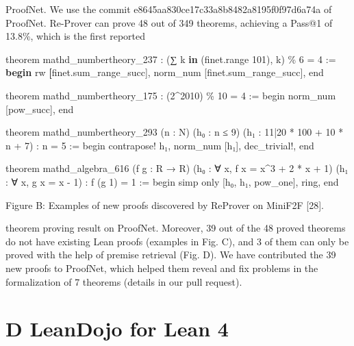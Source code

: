 \documentclass[
]{article}
\newenvironment{Shaded}{}{}
\newcommand{\AttributeTok}[1]{\textcolor[rgb]{0.49,0.56,0.16}{#1}}
\newcommand{\ControlFlowTok}[1]{\textcolor[rgb]{0.00,0.44,0.13}{\textbf{#1}}}
\newcommand{\DecValTok}[1]{\textcolor[rgb]{0.25,0.63,0.44}{#1}}
\newcommand{\KeywordTok}[1]{\textcolor[rgb]{0.00,0.44,0.13}{\textbf{#1}}}
\newcommand{\NormalTok}[1]{#1}
\newcommand{\OperatorTok}[1]{\textcolor[rgb]{0.40,0.40,0.40}{#1}}
\newcommand{\VerbatimStringTok}[1]{\textcolor[rgb]{0.25,0.44,0.63}{#1}}
\begin{document}
ProofNet. We use the commit e8645aa830ce17c33a8b8482a8195f0f97d6a74a of
ProofNet. Re-Prover can prove 48 out of 349 theorems, achieving a Pass@1
of 13.8\%, which is the first reported

\begin{Shaded}
\begin{Highlighting}[]
\NormalTok{theorem mathd\_numbertheory\_237 }\OperatorTok{:}
\NormalTok{(∑ k }\ControlFlowTok{in}\NormalTok{ (finet}\AttributeTok{.range} \DecValTok{101}\NormalTok{), k) }\OperatorTok{\%} \DecValTok{6} \OperatorTok{=} \DecValTok{4} \OperatorTok{:=}
\ControlFlowTok{begin}
\NormalTok{rw }\KeywordTok{[}\NormalTok{finet}\AttributeTok{.sum\_range\_succ}\VerbatimStringTok{\textquotesingle{}],}
\VerbatimStringTok{norm\_num [finet.sum\_range\_succ],}
\VerbatimStringTok{end}

\VerbatimStringTok{theorem mathd\_numbertheory\_175 :}
\VerbatimStringTok{(2\^{}2010) \% 10 = 4 :=}
\VerbatimStringTok{begin}
\VerbatimStringTok{norm\_num [pow\_succ],}
\VerbatimStringTok{end}

\VerbatimStringTok{theorem mathd\_numbertheory\_293}
\VerbatimStringTok{(n : N)}
\VerbatimStringTok{(h₀ : n ≤ 9)}
\VerbatimStringTok{(h₁ : 11|20 * 100 + 10 * n + 7) :}
\VerbatimStringTok{n = 5 :=}
\VerbatimStringTok{begin}
\VerbatimStringTok{contrapose! h₁,}
\VerbatimStringTok{norm\_num [h₁],}
\VerbatimStringTok{dec\_trivial!,}
\VerbatimStringTok{end}

\VerbatimStringTok{theorem mathd\_algebra\_616}
\VerbatimStringTok{(f g : R → R)}
\VerbatimStringTok{(h₀ : ∀ x, f x = x\^{}3 + 2 * x + 1)}
\VerbatimStringTok{(h₁ : ∀ x, g x = x {-} 1) :}
\VerbatimStringTok{f (g 1) = 1 :=}
\VerbatimStringTok{begin}
\VerbatimStringTok{simp only [h₀, h₁, pow\_one],}
\VerbatimStringTok{ring,}
\VerbatimStringTok{end }
\end{Highlighting}
\end{Shaded}

Figure B: Examples of new proofs discovered by ReProver on MiniF2F
{[}28{]}.

theorem proving result on ProofNet. Moreover, 39 out of the 48 proved
theorems do not have existing Lean proofs (examples in Fig. C), and 3 of
them can only be proved with the help of premise retrieval (Fig. D). We
have contributed the 39 new proofs to ProofNet, which helped them reveal
and fix problems in the formalization of 7 theorems (details in our pull
request).

\section{D LeanDojo for Lean 4}\label{d-leandojo-for-lean-4}
\end{document}
